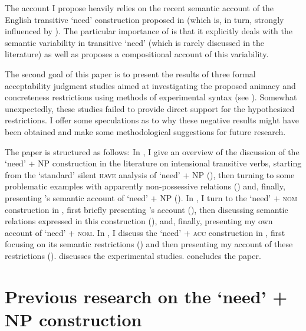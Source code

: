 \documentclass[output=paper]{langscibook}
\begin{document}
The account I propose heavily relies on the recent semantic account of the English transitive `need' construction proposed in \citet{Zaroukian.Beller2013} (which is, in turn, strongly influenced by \citealt{Vikner.Jensen2002}). The particular importance of \citet{Zaroukian.Beller2013} is that it explicitly deals with the semantic variability in transitive `need' (which is rarely discussed in the literature) as well as proposes a compositional account of this variability.

The second goal of this paper is to present the results of three formal acceptability judgment studies aimed at investigating the proposed animacy and concreteness restrictions using methods of experimental syntax (see \citealt{Sprouse.Hornstein2013}). Somewhat unexpectedly, these studies failed to provide direct support for the hypothesized restrictions. I offer some speculations as to why these negative results might have been obtained and make some methodological suggestions for future research.

The paper is structured as follows: In , I give an overview of the discussion of the `need' + NP construction in the literature on intensional transitive verbs, starting from the `standard' silent \textsc{have} analysis of `need' + NP (), then turning to some problematic examples with apparently non-possessive relations () and, finally, presenting \citeauthor{Zaroukian.Beller2013}'s \citeyearpar{Zaroukian.Beller2013} semantic account of `need' + NP (). In , I turn to the `need' + \textsc{nom} construction in , first briefly presenting \citeauthor{Harves2008}'s \citeyearpar{Harves2008} account (), then discussing semantic relations expressed in this construction (), and, finally, presenting my own account of `need' + \textsc{nom}. In , I discuss the `need' + \textsc{acc} construction in , first focusing on its semantic restrictions () and then presenting my account of these restrictions ().  discusses the experimental studies.  concludes the paper.

\section{Previous research on the `need' + NP construction\label{section-background}}
\end{document}
